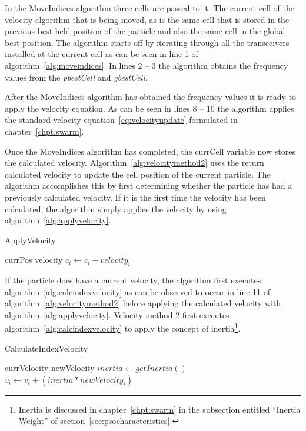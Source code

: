 In the MoveIndices algorithm three cells are passed to it. The current cell of the velocity algorithm that is being moved, as is the same cell that is stored in the previous best-held position of the particle and also the same cell in the global best position. The algorithm starts off by iterating through all the transceivers installed at the current cell as can be seen in line 1 of algorithm~\ref{alg:moveindices}. In lines 2 -- 3 the algorithm obtains the frequency values from the \emph{pbestCell} and \emph{gbestCell}.

After the MoveIndices algorithm has obtained the frequency values it is ready to apply the velocity equation. As can be seen in lines 8 -- 10 the algorithm applies the standard velocity equation~\ref{eq:velocityupdate} formulated in chapter~\ref{chpt:swarm}. 

Once the MoveIndices algorithm has completed, the currCell variable now stores the calculated velocity. Algorithm~\ref{alg:velocitymethod2} uses the return calculated velocity to update the cell position of the current particle. The algorithm accomplishes this by first determining whether the particle has had a previously calculated velocity. If it is the first time the velocity has been calculated, the algorithm simply applies the velocity by using algorithm~\ref{alg:applyvelocity}. 

\begin{algorithm}
\caption{ApplyVelocity}
\label{alg:applyvelocity}
\begin{algorithmic}[1]
	\Require currPos
	\Require velocity
		\State $c_i \leftarrow c_i + velocity_i$
	\EndFor
\end{algorithmic}
\end{algorithm}

If the particle does have a current velocity, the algorithm first executes algorithm~\ref{alg:calcindexvelocity} as can be observed to occur in line 11 of algorithm~\ref{alg:velocitymethod2} before applying the calculated velocity with algorithm~\ref{alg:applyvelocity}. Velocity method 2 first executes algorithm~\ref{alg:calcindexvelocity} to apply the concept of inertia\footnote{Inertia is discussed in chapter~\ref{chpt:swarm} in the subsection entitled ``Inertia Weight'' of section~\ref{sec:psocharacteristics}.}.

\begin{algorithm}
\caption{CalculateIndexVelocity}
\label{alg:calcindexvelocity}
\begin{algorithmic}[1]
	\Require currVelocity
	\Require newVelocity
		\State $inertia \leftarrow getInertia()$
		\State $v_i \leftarrow v_i + (inertia * newVelocity_i)$
	\EndFor
\end{algorithmic}
\end{algorithm}

